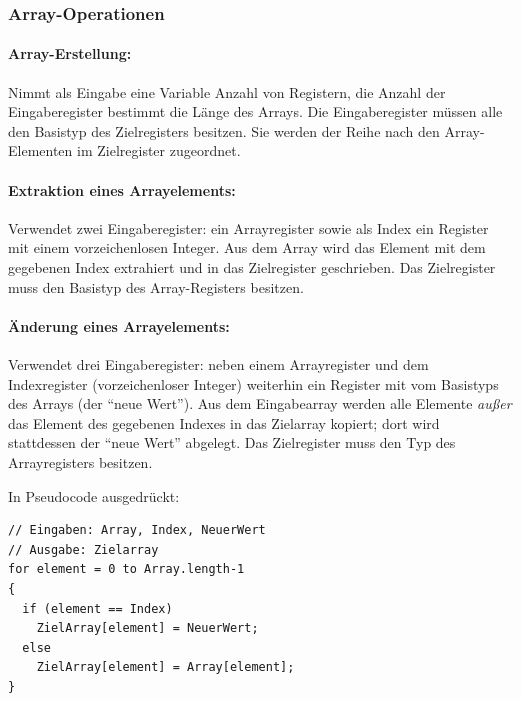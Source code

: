 \documentclass[twoside,a4paper,fleqn,12pt]{book}
\begin{document}
\subsubsection{Array-Operationen}

\paragraph{Array-Erstellung:} Nimmt als Eingabe eine Variable Anzahl von Registern, die Anzahl der Eingaberegister bestimmt die Länge des Arrays.
Die Eingaberegister müssen alle den Basistyp des Zielregisters besitzen. Sie werden der Reihe nach den Array-Elementen im Zielregister zugeordnet.

\paragraph{Extraktion eines Arrayelements:} Verwendet zwei Eingaberegister: ein Arrayregister sowie als Index ein Register mit einem vorzeichenlosen Integer.
Aus dem Array wird das Element mit dem gegebenen Index extrahiert und in das Zielregister geschrieben.
Das Zielregister muss den Basistyp des Array-Registers besitzen.

\paragraph{Änderung eines Arrayelements:} Verwendet drei Eingaberegister: neben einem Arrayregister und dem Indexregister (vorzeichenloser Integer)
weiterhin ein Register mit vom Basistyps des Arrays (der "`neue Wert"').
Aus dem Eingabearray werden alle Elemente \emph{außer} das Element des gegebenen Indexes in das Zielarray kopiert;
dort wird stattdessen der "`neue Wert"' abgelegt. Das Zielregister muss den Typ des Arrayregisters besitzen.

In Pseudocode ausgedrückt:
\begin{lstlisting}
// Eingaben: Array, Index, NeuerWert
// Ausgabe: Zielarray
for element = 0 to Array.length-1
{
  if (element == Index)
    ZielArray[element] = NeuerWert;
  else
    ZielArray[element] = Array[element];
}
\end{lstlisting}
\end{document}
